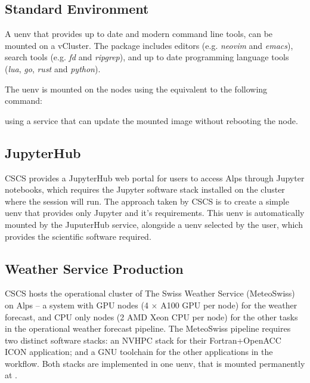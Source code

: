 \subsection{Standard Environment}

A uenv that provides up to date and modern command line tools, can be mounted on a vCluster.
The package includes editors (e.g. \emph{neovim} and \emph{emacs}), search tools (e.g. \emph{fd} and \emph{ripgrep}), and up to date programming language tools (\emph{lua}, \emph{go}, \emph{rust} and \emph{python}).

The uenv is mounted on the nodes using the equivalent to the following command:
\vfill\eject

using a service that can update the mounted image without rebooting the node.

\subsection{JupyterHub}

CSCS provides a JupyterHub web portal for users to access Alps through Jupyter notebooks, which requires the Jupyter software stack installed on the cluster where the session will run.
The approach taken by CSCS is to create a simple  uenv that provides only Jupyter and it's requirements.
This uenv is automatically mounted by the JuputerHub service, alongside a uenv selected by the user, which provides the scientific software required.

\subsection{Weather Service Production}

CSCS hosts the operational cluster of The Swiss Weather Service (MeteoSwiss) on Alps -- a system with GPU nodes (4 $\times$ A100 GPU per node) for the weather forecast, and CPU only nodes (2 AMD Xeon CPU per node) for the other tasks in the operational weather forecast pipeline.
The MeteoSwiss pipeline requires two distinct software stacks: an NVHPC stack for their Fortran+OpenACC ICON application; and a GNU toolchain for the other applications in the workflow.
Both stacks are implemented in one uenv, that is mounted permanently at .

